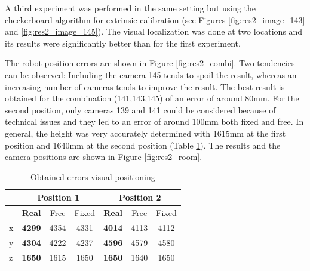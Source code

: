 A third experiment was performed in the same setting but using the checkerboard algorithm for extrinsic calibration (see Figures \ref{fig:res2_image_143} and  \ref{fig:res2_image_145}). 
The visual localization was done at two locations and its results were significantly better than for the first experiment. 

The robot position errors are shown in Figure \ref{fig:res2_combi}. Two tendencies can be observed: 
Including the camera 145 tends to spoil the result, whereas an increasing number of cameras tends to improve the result. The best result is obtained for the combination (141,143,145) of an error of around 80mm.
For the second position, only cameras 139 and 141 could be considered because of technical issues and they led to an error of around 100mm both fixed and free. 
In general, the height was very accurately determined with 1615mm at the first position and 1640mm at the second position (Table \ref{tab:res2_errors}).
The results and the camera positions are shown in Figure \ref{fig:res2_room}.

\begin{table}[H]
\begin{center}
\caption{Obtained errors visual positioning}
\begin{tabular}{lcccccc}
\toprule
    & \multicolumn{3}{c}{\textbf{Position 1}} & \multicolumn{3}{c}{\textbf{Position 2}} \\
\midrule
& \textbf{Real} & Free & Fixed & \textbf{Real} & Free & Fixed \\
x   & \textbf{4299} & 4354 & 4331 & \textbf{4014} & 4113 & 4112  \\
y   & \textbf{4304} & 4222 & 4237 & \textbf{4596} & 4579 & 4580 \\
z   & \textbf{1650} & 1615 & 1650 & \textbf{1650} & 1640 & 1650 \\
\bottomrule
\end{tabular}
\label{tab:res2_errors}
\end{center}
\end{table}

